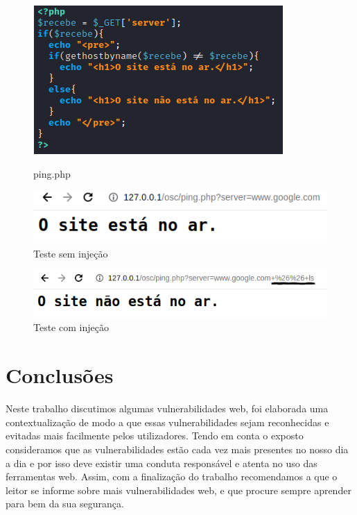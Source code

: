 \documentclass{report}
\begin{document}
\begin{figure}[!htb]
  \includegraphics[width=\linewidth]{imagessqlcode/sqlicode6.png}
  \caption{ping.php}\label{ping.php}
\endminipage\hfill
{}
  \includegraphics[width=\linewidth]{imagessql/Fig24.png}
  \caption{Teste sem injeção}\label{teste sem injeção}
\endminipage
\end{figure}

\begin{figure}[h]
 \centering
 \includegraphics[scale=0.3]{imagessql/Fig25.png}
 \caption{Teste com injeção}\label{teste sem injeção}
\end{figure}

























\chapter{Conclusões}
\label{chap.conclusao}
Neste trabalho discutimos algumas vulnerabilidades web, foi elaborada uma contextualização de modo a que essas vulnerabilidades sejam reconhecidas e evitadas mais facilmente pelos utilizadores.
Tendo em conta o exposto consideramos que as vulnerabilidades estão cada vez mais presentes no nosso dia a dia  e por isso deve existir uma conduta responsável e atenta no uso das  ferramentas web.
Assim, com a finalização do trabalho recomendamos a que o leitor se informe sobre mais vulnerabilidades web, e que procure sempre aprender para bem da sua segurança.
\cite{owasptop10}
\end{document}
